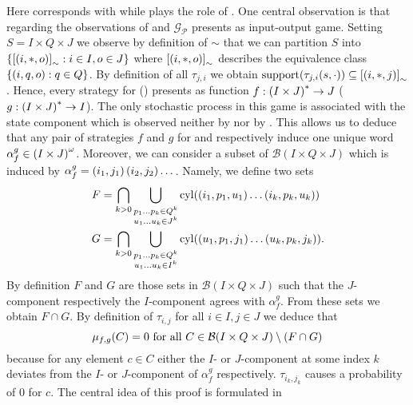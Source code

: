 Here \eve{} corresponds with \outputp{} while \adam{} plays the role of 
. One central observation is that regarding the observations of \eve{} 
and \adam{} $\mathcal{G}_{\mathcal{P}}$ presents as input-output game. Setting 
$S = I\times Q\times J$ we observe by definition of $\sim$ that we can 
partition $S$ into $\left\{\left[\left(i, *, o\right)\right]_{\sim}:i\in I, o\in J\right\}$ 
where $\left[\left(i, *, o\right)\right]_{\sim}$ describes the equivalence class
$\left\{\left(i, q, o\right):q\in Q\right\}$. By definition of all $\tau_{j,i}$ we obtain
$\operatorname{support}(\tau_{j,i}(s, \cdot))\subseteq\left[\left(i,*,j\right)\right]_{\sim}$. Hence,
every strategy for \eve{} (\adam{}) presents as function 
$f:\left(I\times J\right)^{*}\rightarrow J$ 
($g:\left(I\times J\right)^{*}\rightarrow I$). The only stochastic process in this
game is associated with the state component which is observed neither by 
\eve{} nor by \adam{}. This allows us to deduce that any pair of 
strategies $f$ and $g$ for \eve{} and \adam{} respectively induce one unique
word $\alpha_{f}^{g}\in\left(I\times J\right)^{\omega}$. Moreover, we can consider
a subset of $\mathcal{B}(I\times Q\times J)$ which is induced by 
$\alpha_{f}^{g} = \left(i_{1}, j_{1}\right)\left(i_{2}, j_{2}\right)\dots$. Namely, we 
define two sets
\begin{align*}
  F &= \bigcap_{k>0}\bigcup_{
    \substack{
      p_{1}\dots p_{k}\in Q^{k}\\
      u_{1}\dots u_{k}\in J^{k}
    }
  }\operatorname{cyl}(\left(i_{1}, p_{1}, u_{1}\right)\dots\left(i_{k}, p_{k}, u_{k}\right))\\
  G &= \bigcap_{k>0}\bigcup_{
    \substack{
      p_{1}\dots p_{k}\in Q^{k}\\
      u_{1}\dots u_{k}\in I^{k}
    }
  }\operatorname{cyl}(\left(u_{1}, p_{1}, j_{1}\right)\dots\left(u_{k}, p_{k}, j_{k}\right)).
\end{align*}
By definition $F$ and $G$ are those sets in $\mathcal{B}(I\times Q\times J)$ 
such that the $J$-component respectively the $I$-component agrees with 
$\alpha_{f}^{g}$. From these sets we obtain $F\cap G$.
By definition of $\tau_{i, j}$ for all $i\in I, j\in J$ we deduce that 
\begin{equation*}
  \mu_{f,g}(C) = 0\text{ for all }
  C\in \mathcal{B}(I\times Q\times J)\setminus\left(F\cap G\right)
\end{equation*}
because for any element $c\in C$ either the $I$- or $J$-component at some 
index $k$ deviates from the $I$- or $J$-component of $\alpha_{f}^{g}$ 
respectively. $\tau_{i_{k}, j_{k}}$ causes a probability of $0$ for $c$.
The central idea of this proof is formulated in
